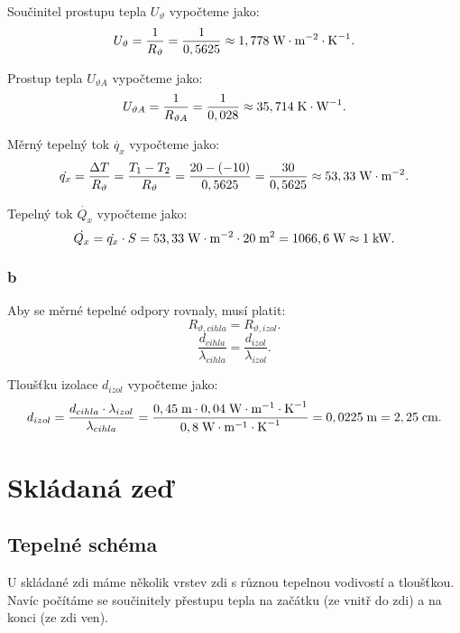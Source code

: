 \documentclass{article}
\begin{document}
Součinitel prostupu tepla $U_\vartheta$ vypočteme jako:
$$
    U_\vartheta = \frac{1}{R_{\vartheta}} = \frac{1}{0,5625} \approx 1,778 \; \textrm{W} \cdot \textrm{m}^{-2} \cdot \textrm{K}^{-1}.
$$

Prostup tepla $U_{\vartheta A}$ vypočteme jako:
$$
    U_{\vartheta A} = \frac{1}{R_{\vartheta A}} = \frac{1}{0,028} \approx 35,714 \; \textrm{K} \cdot \textrm{W}^{-1}.
$$

Měrný tepelný tok $\dot{q_x}$ vypočteme jako:
$$
    \dot{q_x} = \frac{\Delta T}{R_{\vartheta}} = \frac{T_1 - T_2}{R_{\vartheta}} = \frac{20 - (-10)}{0,5625} = \frac{30}{0,5625} \approx 53,33 \; \textrm{W} \cdot \textrm{m}^{-2}.
$$

Tepelný tok $\dot{Q_x}$ vypočteme jako:
$$
    \dot{Q_x} = \dot{q_x} \cdot S = 53,33 \; \textrm{W} \cdot \textrm{m}^{-2} \cdot 20 \; \textrm{m}^{\textrm{2}} = 1066,6 \; \textrm{W} \approx 1 \; \textrm{kW}.
$$


\subsubsection{b}
Aby se měrné tepelné odpory rovnaly, musí platit:
$$
    R_{\vartheta,cihla} = R_{\vartheta,izol}.
$$
$$
    \frac{d_{cihla}}{\lambda_{cihla}} = \frac{d_{izol}}{\lambda_{izol}}.
$$

Tloušťku izolace $d_{izol}$ vypočteme jako:
$$
    d_{izol} = \frac{d_{cihla} \cdot \lambda_{izol}}{\lambda_{cihla}} = \frac{0,45 \; \textrm{m} \cdot 0,04 \; \textrm{W} \cdot \textrm{m}^{-1} \cdot \textrm{K}^{-1}}{0,8 \; \textrm{W} \cdot \textrm{m}^{-1} \cdot \textrm{K}^{-1}} = 0,0225 \; \textrm{m} = 2,25 \; \textrm{cm}.
$$

\newpage




\section{ Skládaná zeď \spicy \spicy}



\subsection{Tepelné schéma}
U skládané zdi máme několik vrstev zdi s různou tepelnou vodivostí a tloušťkou. Navíc počítáme se součinitely přestupu tepla na začátku (ze vnitř do zdi) a na konci (ze zdi ven).
\end{document}
